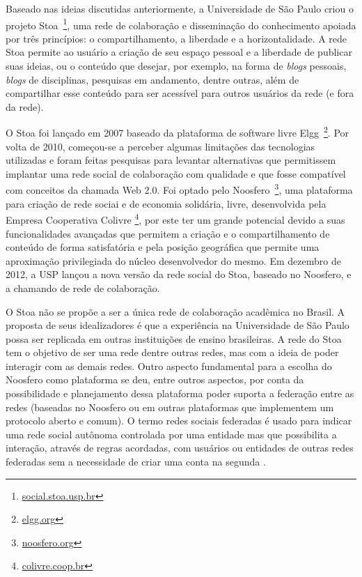 Baseado nas ideias discutidas anteriormente, a Universidade de São Paulo criou o
projeto Stoa~\footnote{\url{social.stoa.usp.br}}, uma rede de colaboração e
disseminação do conhecimento apoiada por três princípios: o compartilhamento, a
liberdade e a horizontalidade.
%
A rede Stoa permite ao usuário a criação de seu espaço pessoal e a liberdade de
publicar suas ideias, ou o conteúdo que desejar, por exemplo, na forma de
\textit{blogs} pessoais, \textit{blogs} de disciplinas, pesquisas em andamento,
dentre outras, além de compartilhar esse conteúdo para ser acessível
para outros usuários da rede (e fora da rede).


O Stoa foi lançado em 2007 baseado da plataforma de software livre
Elgg~\footnote{\url{elgg.org}}.
%
Por volta de 2010, começou-se a perceber algumas limitações das tecnologias
utilizadas e foram feitas pesquisas para levantar alternativas que permitissem
implantar uma rede social de colaboração com qualidade e que fosse compatível
com conceitos da chamada Web 2.0.
%
Foi optado pelo Noosfero~\footnote{\url{noosfero.org}}, uma plataforma para
criação de rede sociai e de economia solidária, livre, desenvolvida pela
Empresa Cooperativa Colivre \footnote{\url{colivre.coop.br}}, por este ter um
grande potencial devido a suas funcionalidades avançadas que permitem a criação
e o compartilhamento de conteúdo de forma satisfatória e pela posição geográfica
que permite uma aproximação privilegiada do núcleo desenvolvedor do mesmo.
%
Em dezembro de 2012, a USP lançou a nova versão da rede social do Stoa, baseado
no Noosfero, e a chamando de rede de colaboração.

O Stoa não se propõe a ser a única rede de colaboração acadêmica no Brasil. A
proposta de seus idealizadores é que a experiência na Universidade de São Paulo
possa ser replicada em outras instituições de ensino brasileiras.
%
A rede do Stoa tem o objetivo de ser uma rede dentre outras redes, mas com a ideia de poder
interagir com as demais redes. Outro aspecto fundamental para a escolha do Noosfero
como plataforma se deu, entre outros aspectos, por conta da possibilidade e
planejamento dessa plataforma poder suporta a federação entre as redes (baseadas
no Noosfero ou em outras plataformas que implementem um protocolo aberto e comum).
%
O termo redes sociais federadas é usado para indicar uma rede social autônoma
controlada por uma entidade mas que possibilita a interação, através de regras
acordadas, com usuários ou entidades de outras redes federadas sem a necessidade
de criar uma conta na segunda \cite{prodomou2010}.

